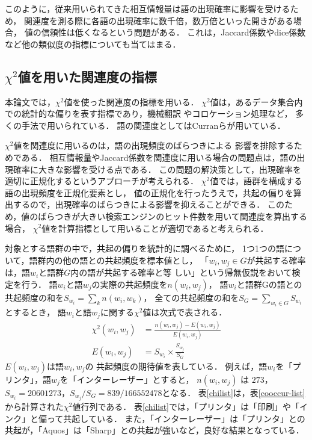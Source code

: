 \documentclass[japanese]{jnlp_1.3a}
\begin{document}
このように，従来用いられてきた相互情報量は語の出現確率に影響を受けるため，
関連度を測る際に各語の出現確率に数千倍，数万倍といった開きがある場合，
値の信頼性は低くなるという問題がある．
これは，Jaccard係数やdice係数など他の類似度の指標についても当てはまる．







\subsection{$\chi^2$値を用いた関連度の指標}

本論文では，$\chi^2$値を使った関連度の指標を用いる．
$\chi^2$値は，あるデータ集合内での統計的な偏りを表す指標であり，機械翻訳
やコロケーション処理など，
多くの手法で用いられている．
語の関連度としてはCurranらが用いている\cite{Curran02-2}．


$\chi^2$値を関連度に用いるのは，語の出現頻度のばらつきによる
影響を排除するためである．
相互情報量やJaccard係数を関連度に用いる場合の問題点は，語の出現確率に大きな影響を受ける点である．
この問題の解決策として，出現確率を適切に正規化するというアプローチが考えられる．
$\chi^2$値では，語群を構成する語の出現頻度を正規化要素とし，
値の正規化を行ったうえで，共起の偏りを算出するので，出現確率のばらつきによる影響を抑えることができる\cite{Yang97}．
このため，値のばらつきが大きい検索エンジンのヒット件数を用いて関連度を算出する場合，
$\chi^2$値を計算指標として用いることが適切であると考えられる．


対象とする語群の中で，共起の偏りを統計的に調べるために，
1つ1つの語について，語群内の他の語との共起頻度を標本値とし，
「$w_i,w_j\in G$が共起する確率は，語$w_i$と語群$G$内の語が共起する確率と等
しい」という帰無仮説をおいて検定を行う．
語$w_i$と語$w_j$の実際の共起頻度を$n(w_i,w_j)$，
語$w_i$と語群Gの語との共起頻度の和を$\displaystyle S_{w_i}=\sum_{k} n(w_i,w_k)$，
全ての共起頻度の和を$\displaystyle S_G=\sum_{w_i \in G} S_{w_i}$とするとき，
語$w_i$と語$w_j$に関する$\chi^2$値は次式で表される．
\begin{align}
 \chi^2(w_i,w_j) & = \frac{n(w_i,w_j) - E(w_i,w_j)}{E(w_i,w_j)}  \nonumber \\
 E(w_i,w_j) & = S_{w_i} \times \frac{S_{w_j}}{S_G} 
\label{chi}
\end{align}
$E(w_i,w_j)$は語$w_i,w_j$の
共起頻度の期待値を表している．
例えば，語$w_i$を「プリンタ」，語$w_j$を「インターレーザー」とすると，
$n(w_i,w_j)$ は $273$，$S_{w_i}=20601273$，${S_{w_j}}/{S_G}=839/166552478$となる．
表\ref{chilist}は，表\ref{cooccur-list}から計算された$\chi^2$値行列である．
表\ref{chilist}では，「プリンタ」は「印刷」や「インク」と偏って共起している．
また，「インターレーザー」は「プリンタ」との共起が，「Aquos」は「Sharp」との共起が強いなど，良好な結果となっている．
\end{document}
